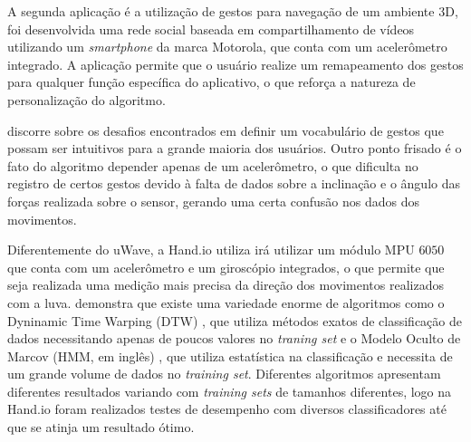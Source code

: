 A segunda aplicação é a utilização de gestos para navegação de um ambiente 3D, foi desenvolvida uma rede social baseada em compartilhamento de vídeos utilizando um \textit{smartphone} da marca Motorola, que conta com um acelerômetro integrado. A aplicação permite que o usuário realize um remapeamento dos gestos para qualquer função específica do aplicativo, o que reforça a natureza de personalização do algoritmo.

 discorre sobre os desafios encontrados em definir um vocabulário de gestos que possam ser intuitivos para a grande maioria dos usuários. Outro ponto frisado é o fato do algoritmo depender apenas de um acelerômetro, o que dificulta no registro de certos gestos devido à falta de dados sobre a inclinação e o ângulo das forças realizada sobre o sensor, gerando uma certa confusão nos dados dos movimentos.

Diferentemente do uWave, a Hand.io utiliza irá utilizar um módulo MPU $6050$ \cite{invensense} que conta com um acelerômetro e um giroscópio integrados, o que permite que seja realizada uma medição mais precisa da direção dos movimentos realizados com a luva.  demonstra que existe uma variedade enorme de algoritmos como o Dyninamic Time Warping (DTW) \cite{dtw}, que utiliza métodos exatos de classificação de dados necessitando apenas de poucos valores no \textit{traning set} e o Modelo Oculto de Marcov (HMM, em inglês) \cite{hmm:1989}, que utiliza estatística na classificação e necessita de um grande volume de dados no \textit{training set}. Diferentes algoritmos apresentam diferentes resultados variando com \textit{training sets} de tamanhos diferentes, logo na Hand.io foram realizados testes de desempenho com diversos classificadores até que se atinja um resultado ótimo.

